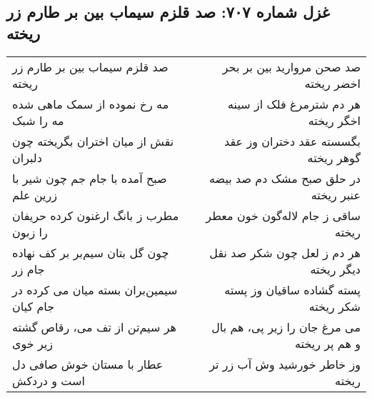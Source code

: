 \begin{center}
\section*{غزل شماره ۷۰۷: صد قلزم سیماب بین بر طارم زر ریخته}
\label{sec:707}
\begin{longtable}{l p{0.5cm} r}
صد قلزم سیماب بین بر طارم زر ریخته
&&
صد صحن مروارید بین بر بحر اخضر ریخته
\\
مه رخ نموده از سمک ماهی شده مه را شبک
&&
هر دم شترمرغ فلک از سینه اخگر ریخته
\\
نقش از میان اختران بگریخته چون دلبران
&&
بگسسته عقد دختران وز عقد گوهر ریخته
\\
صبح آمده با جام جم چون شیر با زرین علم
&&
در حلق صبح مشک دم صد بیضه عنبر ریخته
\\
مطرب ز بانگ ارغنون کرده حریفان را زبون
&&
ساقی ز جام لاله‌گون خون معطر ریخته
\\
چون گل بتان سیم‌بر بر کف نهاده جام زر
&&
هر دم ز لعل چون شکر صد نقل دیگر ریخته
\\
سیمین‌بران بسته میان می کرده در جام کیان
&&
پسته گشاده ساقیان وز پسته شکر ریخته
\\
هر سیم‌تن از تف می، رقاص گشته زیر خوی
&&
می مرغ جان را زیر پی، هم بال و هم پر ریخته
\\
عطار با مستان خوش صافی دل است و دردکش
&&
وز خاطر خورشید وش آب زر تر ریخته
\\
\end{longtable}
\end{center}
